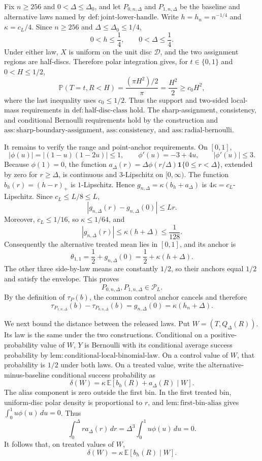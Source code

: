 Fix \(n\ge256\) and \(0<\Delta\le\Delta_0\), and let \(P_{0,n,\Delta}\) and \(P_{1,n,\Delta}\) be the baseline and alternative laws named by \(\mathrm{def:joint\text{-}lower\text{-}handle}\).  Write \(h=h_n=n^{-1/4}\) and \(\kappa=c_L/4\).  Since \(n\ge256\) and \(\Delta\le\Delta_0\le1/4\),
\[
 0<h\le\frac14,
 \qquad 0<\Delta\le\frac14.
\]
Under either law, \(X\) is uniform on the unit disc \(\mathcal D\), and the two assignment regions are half-discs.  Therefore polar integration gives, for \(t\in\{0,1\}\) and \(0<H\le1/2\),
\[
 \mathbb P(T=t,R<H)
 =\frac{(\pi H^2)/2}{\pi}
 =\frac{H^2}{2}
 \ge c_0H^2,
\]
where the last inequality uses \(c_0\le1/2\).  Thus the support and two-sided local-mass requirements in \(\mathrm{def:half\text{-}disc\text{-}class}\) hold.  The sharp-assignment, consistency, and conditional Bernoulli requirements hold by the construction and \(\mathrm{ass:sharp\text{-}boundary\text{-}assignment}\), \(\mathrm{ass:consistency}\), and \(\mathrm{ass:radial\text{-}bernoulli}\).

It remains to verify the range and point-anchor requirements.  On \([0,1]\),
\[
 |\phi(u)|=|(1-u)(1-2u)|\le1,
 \qquad
 \phi'(u)=-3+4u,
 \qquad
 |\phi'(u)|\le3.
\]
Because \(\phi(1)=0\), the function \(a_\Delta(r)=\Delta\phi(r/\Delta)\mathbf1\{0\le r<\Delta\}\), extended by zero for \(r\ge\Delta\), is continuous and \(3\)-Lipschitz on \([0,\infty)\).  The function \(b_h(r)=(h-r)_+\) is \(1\)-Lipschitz.  Hence \(g_{n,\Delta}=\kappa(b_h+a_\Delta)\) is \(4\kappa=c_L\)-Lipschitz.  Since \(c_L\le L/8\le L\),
\[
 |g_{n,\Delta}(r)-g_{n,\Delta}(0)|\le Lr.
\]
Moreover, \(c_L\le1/16\), so \(\kappa\le1/64\), and
\[
 |g_{n,\Delta}(r)|
 \le\kappa(h+\Delta)
 \le\frac{1}{128}.
\]
Consequently the alternative treated mean lies in \([0,1]\), and its anchor is
\[
 \theta_{1,1}=\frac12+g_{n,\Delta}(0)
 =\frac12+\kappa(h+\Delta).
\]
The other three side-by-law means are constantly \(1/2\), so their anchors equal \(1/2\) and satisfy the envelope.  This proves
\[
 P_{0,n,\Delta},P_{1,n,\Delta}\in\mathcal P_L.
\]
By the definition of \(\tau_P(b)\), the common control anchor cancels and therefore
\[
 \tau_{P_{1,n,\Delta}}(b)-\tau_{P_{0,n,\Delta}}(b)
 =g_{n,\Delta}(0)
 =\kappa(h_n+\Delta).
\]

We next bound the distance between the released laws.  Put \(W=(T,Q_\Delta(R))\).  Its law is the same under the two constructions.  Conditional on a positive-probability value of \(W\), \(Y\) is Bernoulli with its conditional average success probability by \(\mathrm{lem:conditional\text{-}local\text{-}binomial\text{-}law}\).  On a control value of \(W\), that probability is \(1/2\) under both laws.  On a treated value, write the alternative-minus-baseline conditional success probability as
\[
 \delta(W)=\kappa\,\mathbb E[b_h(R)+a_\Delta(R)\mid W].
\]
The alias component is zero outside the first bin.  In the first treated bin, uniform-disc polar density is proportional to \(r\), and \(\mathrm{lem:first\text{-}bin\text{-}alias}\) gives \(\int_0^1u\phi(u)\,du=0\).  Thus
\[
 \int_0^\Delta r a_\Delta(r)\,dr
 =\Delta^3\int_0^1u\phi(u)\,du
 =0.
\]
It follows that, on treated values of \(W\),
\[
 \delta(W)=\kappa\,\mathbb E[b_h(R)\mid W].
\]

